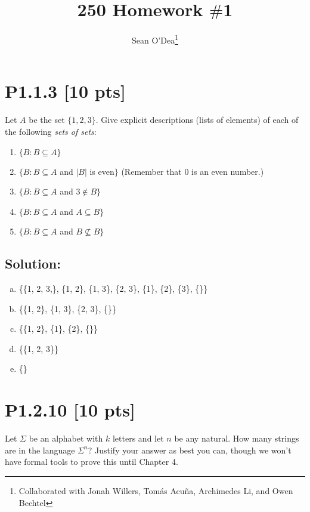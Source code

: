 \documentclass[12pt]{article}
\title{250 Homework $\#$1}
\author{Sean O'Dea\footnote{Collaborated with Jonah Willers, Tom\'as Acu\~na, Archimedes Li, and Owen Bechtel}}
\begin{document}
\maketitle

\section*{\textbf{P1.1.3} [10 pts]}
Let $A$ be the set $\{1, 2, 3\}$. Give explicit descriptions (lists of elements) of each of the following \textit{sets of sets}:

\begin{enumerate}[label=(\alph*)]
    \item $\{B : B \subseteq A\}$
    \item $\{B : B \subseteq A$ and $|B|$ is even$\}$ (Remember that 0 is an even number.)
    \item $\{B : B \subseteq A$ and $ 3 \notin B\}$
    \item $\{B : B \subseteq A$ and $ A\subseteq B\}$
    \item $\{B : B \subseteq A$ and $ B \not\subseteq B\}$
\end{enumerate}


\subsection*{\textbf{Solution:}}
\begin{enumerate}[(a)]
    \item \{\{1, 2, 3,\}, \{1, 2\}, \{1, 3\}, \{2, 3\}, \{1\}, \{2\}, \{3\}, \{\}\}

    \item \{\{1, 2\}, \{1, 3\}, \{2, 3\}, \{\}\}

    \item \{\{1, 2\}, \{1\}, \{2\}, \{\}\}

    \item \{\{1, 2, 3\}\}

    \item \{\}

\end{enumerate}


\newpage
\section*{\textbf{P1.2.10} [10 pts]}
Let $\Sigma $ be an alphabet with $k$ letters and let $n$ be any natural. How many strings are in the language $\Sigma^ n$? Justify your answer as best you can, though we won’t have formal tools to prove this until Chapter 4.
\end{document}
